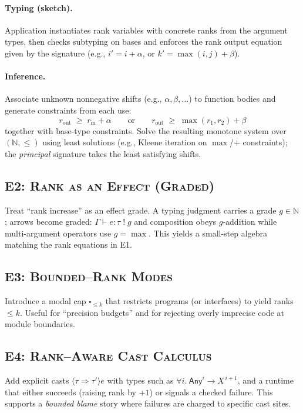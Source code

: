 \paragraph{Typing (sketch).}
Application instantiates rank variables with concrete ranks from the argument types,
then checks subtyping on bases and enforces the rank output equation given by the signature
(e.g., $i'\!=\!i{+}\alpha$, or $k'\!=\!\max(i,j){+}\beta$).

\paragraph{Inference.}
Associate unknown nonnegative shifts (e.g., $\alpha,\beta,\dots$) to function bodies and generate constraints from each use:
\[
r_{\text{out}} \;\ge\; r_{\text{in}} + \alpha
\qquad\text{or}\qquad
r_{\text{out}} \;\ge\; \max(r_1,r_2) + \beta
\]
together with base-type constraints.
Solve the resulting monotone system over $(\mathbb{N},\le)$ using least solutions
(e.g., Kleene iteration on $\max$/$+$ constraints); the \emph{principal} signature takes the least satisfying shifts.

\medskip

\subsection{\textsc{E2: Rank as an Effect (Graded)}}
Treat “rank increase” as an effect grade.
A typing judgment carries a grade $g\in\mathbb{N}$; arrows become graded:
\(
\Gamma \vdash e : \tau \;!\; g
\)
and composition obeys $g$-addition while multi-argument operators use $g=\max$.
This yields a small-step algebra matching the rank equations in \textsc{E1}.

\subsection{\textsc{E3: Bounded–Rank Modes}}
Introduce a modal cap $\square_{\le k}$ that restricts programs (or interfaces) to yield ranks $\le k$.
Useful for “precision budgets” and for rejecting overly imprecise code at module boundaries.

\subsection{\textsc{E4: Rank–Aware Cast Calculus}}
Add explicit casts $\langle \tau \Rightarrow \tau'\rangle e$ with types such as
$\forall i.\ \textsf{Any}^{i} \to X^{\,i+1}$,
and a runtime that either succeeds (raising rank by $+1$) or signals a checked failure.
This supports a \emph{bounded blame} story where failures are charged to specific cast sites.

